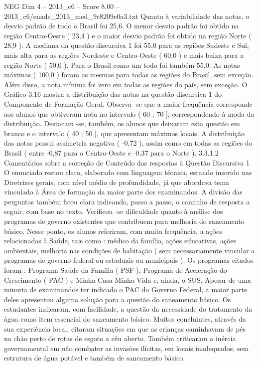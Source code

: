\begin{textsample}{NEG Dim 4 – 2013\_c6 – Score 8.00 – 2013\_c6/enade\_2013\_med\_9c8209e0a3.txt}
Quanto à variabilidade das notas, o desvio padrão de todo o Brasil foi 25,6.
O menor desvio padrão foi obtido na região Centro-Oeste ( 23,4 ) e o maior desvio padrão foi obtido na região Norte ( 28,9 ).
A mediana da questão discursiva 1 foi 55,0 para as regiões Sudeste e Sul, mais alta para as regiões Nordeste e Centro-Oeste ( 60,0 ) e mais baixa para a região Norte ( 50,0 ).
Para o Brasil como um todo foi também 55,0.
As notas máximas ( 100,0 ) foram as mesmas para todas as regiões do Brasil, sem exceção.
Além disso, a nota mínima foi zero em todas as regiões do país, sem exceção.
O Gráfico 3.16 mostra a distribuição das notas na questão discursiva 1 do Componente de Formação Geral.
Observa -se que a maior frequência corresponde aos alunos que obtiveram nota no intervalo ( 60 ; 70 ], correspondendo à moda da distribuição.
Destacam -se, também, os alunos que deixaram esta questão em branco e o intervalo ( 40 ; 50 ], que apresentam máximos locais.
A distribuição das notas possui assimetria negativa ( -0,72 ), assim como em todas as regiões do Brasil ( entre -0,87 para o Centro-Oeste e -0,37 para o Norte ). 3.3.1.2 Comentários sobre a correção de Conteúdo das respostas à Questão Discursiva 1 O enunciado restou claro, elaborado com linguagem técnica, estando inserido nas Diretrizes gerais, com nível médio de profundidade, já que abordava tema vinculado à Área de formação da maior parte dos examinandos.
A divisão das perguntas também ficou clara indicando, passo a passo, o caminho de resposta a seguir, com base no texto.
Verificou -se dificuldade quanto à análise dos programas de governo existentes que contribuem para melhoria do saneamento básico.
Nesse ponto, os alunos referiram, com muita frequência, a ações relacionadas à Saúde, tais como : médico da família, ações educativas, ações ambientais, melhoria nas condições de habitação ( sem necessariamente vincular a programas de governo federal ou estaduais ou municipais ).
Os programas citados foram : Programa Saúde da Família ( PSF ), Programa de Aceleração do Crescimento ( PAC ) e Minha Casa Minha Vida e, ainda, o SUS.
Apesar de uma minoria de examinandos ter indicado o PAC do Governo Federal, a maior parte deles apresentou alguma solução para a questão do saneamento básico.
Os estudantes indicaram, com facilidade, a questão da necessidade do tratamento da água como item essencial do saneamento básico.
Muitos concluintes, através da sua experiência local, citaram situações em que as crianças caminhavam de pés no chão perto de rotas de esgoto a céu aberto.
Também criticaram a inércia governamental em não combater as invasões ilícitas, em locais inadequados, sem estrutura de água potável e também de saneamento básico.

\end{textsample}
